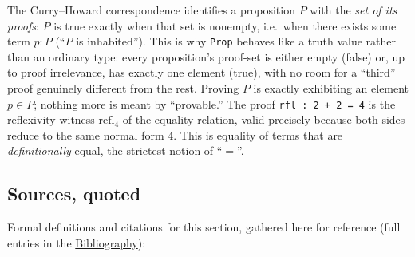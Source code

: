 \begin{mathreading}

The Curry--Howard correspondence identifies a proposition \(P\) with the \emph{set of its proofs}: \(P\) is true exactly when that set is nonempty, i.e.~when there exists some term \(p : P\) (``\(P\) is inhabited''). This is why \texttt{Prop} behaves like a truth value rather than an ordinary type: every proposition's proof-set is either empty (false) or, up to proof irrelevance, has exactly one element (true), with no room for a ``third'' proof genuinely different from the rest. Proving \(P\) is exactly exhibiting an element \(p \in P\); nothing more is meant by ``provable.'' The proof \texttt{rfl : 2 + 2 = 4} is the reflexivity witness \(\mathrm{refl}_4\) of the equality relation, valid precisely because both sides reduce to the same normal form \(4\). This is equality of terms that are \emph{definitionally} equal, the strictest notion of ``\(=\)''.

\end{mathreading}

\subsection{Sources, quoted}\label{sec:03-propositions-and-proofs:01-prop:3}

Formal definitions and citations for this section, gathered here for reference (full entries in the \hyperref[sec:root:bibliography:1]{Bibliography}):

